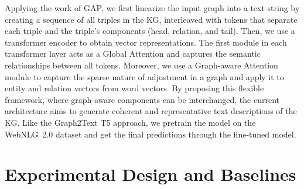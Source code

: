 Applying the work of GAP, we first linearize the input graph into a text string by creating a sequence of all triples in the KG, interleaved with tokens that separate each triple and the triple's components (head, relation, and tail). Then, we use a transformer encoder to obtain vector representations. The first module in each transformer layer acts as a Global Attention and captures the semantic relationships between all tokens. Moreover, we use a Graph-aware Attention module to capture the sparse nature of adjustment in a graph and apply it to entity and relation vectors from word vectors. By proposing this flexible framework, where graph-aware components can be interchanged, the current architecture aims to generate coherent and representative text descriptions of the KG. Like the Graph2Text T5 approach, we pretrain the model on the WebNLG~2.0 dataset and get the final predictions through the fine-tuned model. 


 

% 


\section{Experimental Design and Baselines}
\label{sec:methods_experimental_design}


